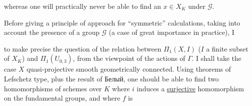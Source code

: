 whereas one will practically never be able to find an $x\in X_K$   under $\mathcal G$.

Before giving a principle of approach for ``symmetric'' calculations, taking into account the presence of a group $\mathcal G$ (a case of great importance in practice), I  to make precise the question of the relation between $\Pi_1(X,I)$ ($I$ a finite subset of $X_K$) and $\Pi_1(U_{0,3})$,  from the viewpoint of the actions of $\Gamma$.
  I shall take the case $X$ quasi-projective smooth geometrically connected. Using theorems of Lefschetz type, plus the result of  Белый, one  should be able to find two homomorphisms of schemes over $K$
where $i$ induces a \uline{surjective} homomorphism on the fundamental groups, and where $f$ is
